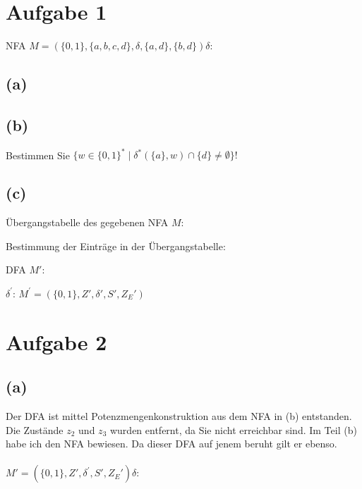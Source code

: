 \documentclass[titlepage]{article}
\renewcommand{\]}{\right]}
\renewcommand{\[}{\left[}
\renewcommand{\)}{\right)}
\renewcommand{\(}{\left(}
\renewcommand{\|}{\;|\;}
\renewcommand{\l}{\linebreak}
\begin{document}
\begingroup\let\clearpage\relax
	
	
	\section*{Aufgabe 1}
		\tab NFA $M=(\{0,1\},\{a,b,c,d\},\delta,\{a,d\},\{b,d\})$\tab$\delta$:\l
		\begin{center}
			
			
		\end{center}
	
		\subsection*{(a)}
			
			
			
		\subsection*{(b)}Bestimmen Sie $\{w\in\{0,1\}^*\mid\delta^*(\{a\},w)\cap\{d\}\neq\emptyset\}!$
			
			
		\subsection*{(c)}
		Übergangstabelle des gegebenen NFA $M$:
		\begin{center}
			
		\end{center}
		Bestimmung der Einträge in der Übergangstabelle:
		\begin{center}	
			
		\end{center}
		DFA $M'$:
		\begin{center}
			$\delta^{'}$:\l
			\l
			$M^{'}=(\{0,1\},Z',\delta',S',Z_E')$
		\end{center}
	\section*{Aufgabe 2}
	\subsection*{(a)}
		Der DFA ist mittel Potenzmengenkonstruktion aus dem NFA in (b) entstanden. Die Zustände $z_2$ und $z_3$ wurden entfernt, da Sie nicht erreichbar sind. Im Teil (b) habe ich den NFA bewiesen. Da dieser DFA auf jenem beruht gilt er ebenso.\\\\
		\tab$M'=(\{0,1\},Z',\delta^{'},S',Z_E')$\tab$\delta$:\\
		\begin{center}
			
			
		\end{center}
\end{document}
